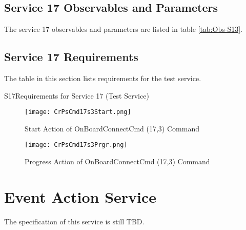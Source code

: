 \documentclass{pnp_article}
\begin{document}


\subsection{Service 17 Observables and Parameters}\label{sec:serv17Obs}
The service 17 observables and parameters are listed in table \ref{tab:Obs-S13}.



\subsection{Service 17 Requirements}
The table in this section lists requirements for the test service.

\begin{crReq}{S17}{Requirements for Service 17 (Test Service)}
\end{crReq}

\newpage
\begin{figure}[H]
 \centering
 \texttt{[image: CrPsCmd17s3Start.png]}
 \caption{Start Action of OnBoardConnectCmd (17,3) Command}
 \label{fig:Cmd17s3Start}
\end{figure}

\begin{figure}[H]
 \centering
 \texttt{[image: CrPsCmd17s3Prgr.png]}
 \caption{Progress Action of OnBoardConnectCmd (17,3) Command}
 \label{fig:Cmd17s3Prgr}
\end{figure}


\section{Event Action Service}\label{sec:serv19}
The specification of this service is still TBD.
\end{document}
